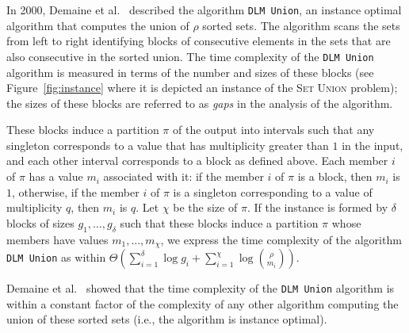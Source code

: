 In 2000, Demaine et
al.~\cite{2000-SODA-AdaptiveSetIntersectionsUnionsAndDifferences-DemaineLopezOrtizMunro}
described the algorithm \texttt{DLM Union}, an instance optimal
algorithm that computes the union of $\rho$ sorted sets.  The
algorithm scans the sets from left to right identifying blocks of
consecutive elements in the sets that are also consecutive in the
sorted union. The time complexity of the \texttt{DLM Union} algorithm
is measured in terms of the number and sizes of these blocks (see
Figure~\ref{fig:instance} where it is depicted an instance of the
\textsc{Set Union} problem); the sizes of these blocks are referred to
as \emph{gaps} in the analysis of the algorithm.
\begin{INUTILE}
  These blocks induce a partition $\pi$ of the output into intervals
  such that any singleton corresponds to a value that has multiplicity
  greater than $1$ in the input, and each other interval corresponds
  to a block as defined above. Each member $i$ of $\pi$ has a value
  $m_i$ associated with it: if the member $i$ of $\pi$ is a block,
  then $m_i$ is $1$, otherwise, if the member $i$ of $\pi$ is a
  singleton corresponding to a value of multiplicity $q$, then $m_i$
  is $q$.
%
  Let $\chi$ be the size of $\pi$.
%
  If the instance is formed by $\delta$ blocks of sizes
  $g_1, \dots, g_{\delta}$ such that these blocks induce a partition
  $\pi$ whose members have values $m_1, \dots, m_{\chi}$, we express
  the time complexity of the algorithm \texttt{DLM Union} as within
  $\Theta(\sum^{\delta}_{i=1}\log g_i +
  \sum^{\chi}_{i=1}\log{\binom{\rho}{m_i}})$.
\end{INUTILE}
%
Demaine et
al.~\cite{2000-SODA-AdaptiveSetIntersectionsUnionsAndDifferences-DemaineLopezOrtizMunro}
showed that the time complexity of the \texttt{DLM Union} algorithm is
within a constant factor of the complexity of any other algorithm
computing the union of these sorted sets (i.e., the algorithm is
instance optimal).


